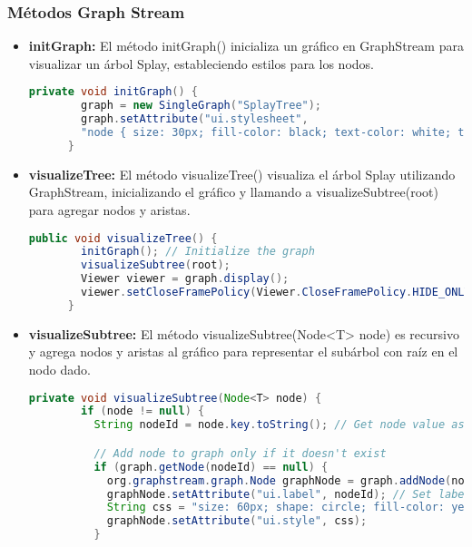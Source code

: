 \documentclass{article}
\begin{document}
  \subsubsection{Métodos Graph Stream}
  \begin{itemize}
    \item \textbf{initGraph: }El método initGraph() inicializa un gráfico en GraphStream para visualizar un árbol Splay, 
    estableciendo estilos para los nodos.
    \begin{lstlisting}[language=Java, caption={Método initGraph}]
      private void initGraph() {
        graph = new SingleGraph("SplayTree");
        graph.setAttribute("ui.stylesheet",
        "node { size: 30px; fill-color: black; text-color: white; text-size: 15px; }");
      }
    \end{lstlisting}
    \item \textbf{visualizeTree: }El método visualizeTree() visualiza el árbol Splay utilizando GraphStream, inicializando 
    el gráfico y llamando a visualizeSubtree(root) para agregar nodos y aristas.
    \begin{lstlisting}[language=Java, caption={Método visualizeTree}]
      public void visualizeTree() {
        initGraph(); // Initialize the graph
        visualizeSubtree(root);
        Viewer viewer = graph.display();
        viewer.setCloseFramePolicy(Viewer.CloseFramePolicy.HIDE_ONLY);
      }
    \end{lstlisting}
    \item \textbf{visualizeSubtree: }El método visualizeSubtree(Node<T> node) es recursivo y agrega nodos y aristas al gráfico para representar 
    el subárbol con raíz en el nodo dado.
    \begin{lstlisting}[language=Java, caption={Método visualizeSubtree}]
      private void visualizeSubtree(Node<T> node) {
        if (node != null) {
          String nodeId = node.key.toString(); // Get node value as String

          // Add node to graph only if it doesn't exist
          if (graph.getNode(nodeId) == null) {
            org.graphstream.graph.Node graphNode = graph.addNode(nodeId);
            graphNode.setAttribute("ui.label", nodeId); // Set label with node value
            String css = "size: 60px; shape: circle; fill-color: yellow; text-color: black; text-size: 40px;";
            graphNode.setAttribute("ui.style", css);
          }


\end{lstlisting}
\end{itemize}
\end{document}
